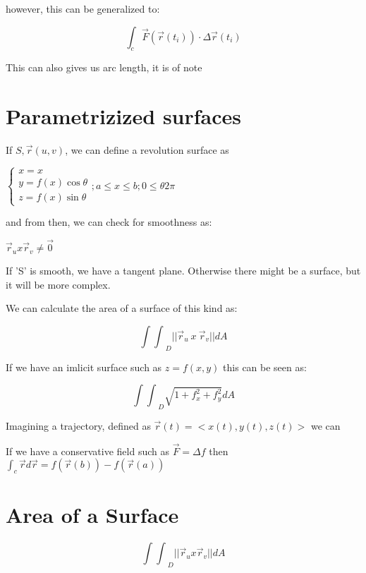 \documentclass[11pt,fleqn]{book} %
\begin{document}
however, this can be generalized to:

\begin{equation}
    \int_c \vec{F}(\vec{r}(t_i)) \cdot \Delta \vec{r} (t_i)
\end{equation}

This can also gives us arc length, it is of note 

\section{Parametrizized surfaces}

If $S, \vec{r}(u,v)$, we can define a revolution surface as 

$\begin{cases}
x = x \\
y = f(x)\cos{\theta}\\
z = f(x)\sin{\theta}    
\end{cases} ; a \leq x \leq b; 0 \leq \theta 2 \pi$

and from then, we can check for smoothness as:

$ \vec{r}_u x \vec{r}_v \neq \vec{0} $

If 'S' is smooth, we have a tangent plane. Otherwise there might be a surface, but it will be more complex.

We can calculate the area of a surface of this kind as:

\begin{equation}
    {\int\int}_D ||\vec{r}_u \ x \ \vec{r}_v|| dA
\end{equation}

If we have an imlicit surface such as $z = f(x,y)$ this can be seen as:

\begin{equation}
    {\int\int}_D \sqrt{1 + f_x^2 + f_y^2} dA
\end{equation}

Imagining a trajectory, defined as $\vec{r}(t) = <x(t),y(t),z(t)>$ we can

If we have a conservative field such as $\vec{F} = \Delta f$
then $\int_c \vec{r} d\vec{r} = f(\vec{r}(b)) - f(\vec{r}(a))$



\section{Area of a Surface}

\begin{equation}
    {\int\int}_D ||\vec{r}_u x \vec{r}_v|| dA 
\end{equation}
\end{document}
